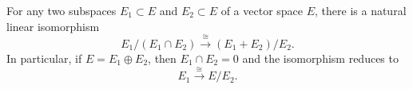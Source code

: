 For any two subspaces $E_1 \subset E$ and $E_2 \subset E$ of a vector space $E$, there is a natural linear isomorphism
$$
E_1 / (E_1 \cap E_2) \xrightarrow{\cong} (E_1 + E_2) / E_2.
$$
In particular, if $E = E_1 \oplus E_2$, then $E_1 \cap E_2 = 0$ and the isomorphism reduces to
$$
E_1 \xrightarrow{\cong} E / E_2.
$$
